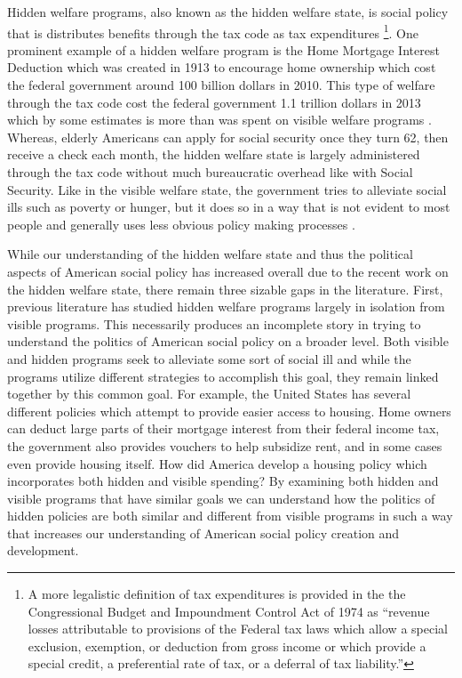 \documentclass[12pt]{article}
\begin{document}
Hidden welfare programs, also known as the hidden welfare state, is social policy that is distributes benefits through the tax code as tax expenditures \citep{howard1997}\footnote{A more legalistic definition of tax expenditures is provided in the the Congressional Budget and Impoundment Control Act of 1974 as ``revenue losses attributable to provisions of the Federal tax laws which allow a special exclusion, exemption, or deduction from gross income or which provide a special credit, a preferential rate of tax, or a deferral of tax liability.''}. One prominent example of a hidden welfare program is the Home Mortgage Interest Deduction which was created in 1913 to encourage home ownership which cost the federal government around 100 billion dollars in 2010. This type of welfare through the tax code cost the federal government 1.1 trillion dollars in 2013 which by some estimates is more than was spent on visible welfare programs \citep{omb2013}. Whereas, elderly Americans can apply for social security once they turn 62, then receive a check each month, the hidden welfare state is largely administered through the tax code without much bureaucratic overhead like with Social Security. Like in the visible welfare state, the government tries to alleviate social ills such as poverty or hunger, but it does so in a way that is not evident to most people and generally uses less obvious policy making processes \citep{mettler2011}. 

While our understanding of the hidden welfare state and thus the political aspects of American social policy has increased overall due to the recent work on the hidden welfare state, there remain three sizable gaps in the literature. First, previous literature has studied hidden welfare programs largely in isolation from visible programs. This necessarily produces an incomplete story in trying to understand the politics of American social policy on a broader level. Both visible and hidden programs seek to alleviate some sort of social ill and while the programs utilize different strategies to accomplish this goal, they remain linked together by this common goal. For example, the United States has several different policies which attempt to provide easier access to housing. Home owners can deduct large parts of their mortgage interest from their federal income tax, the government also provides vouchers to help subsidize rent, and in some cases even provide housing itself. How did America develop a housing policy which incorporates both hidden and visible spending? By examining both hidden and visible programs that have similar goals we can understand how the politics of hidden policies are both similar and different from visible programs in such a way that increases our understanding of American social policy creation and development.
\end{document}
